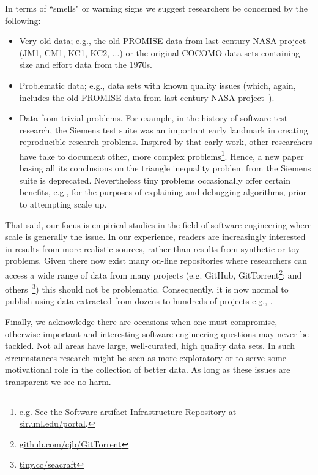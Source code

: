 \documentclass[10pt]{elsarticle}
\begin{document}
In terms of ``smells" or warning signs we suggest researchers be concerned by the following:
\begin{itemize}
\item Very old data; e.g., the old PROMISE data from last-century NASA project (JM1, CM1, KC1, KC2, ...) or the original COCOMO data sets containing size and effort data from the 1970s.
\item Problematic data; e.g., data sets with known quality issues (which, again, includes the old PROMISE data from last-century NASA project~\cite{shepperd13}).
\item Data from trivial problems.  For example, in the history of software test research, the Siemens test suite
was an important early landmark in creating reproducible research problems. Inspired by that early work, other researchers have take to document other, more complex problems\footnote{e.g. See the Software-artifact Infrastructure Repository at
\href{http://sir.unl.edu/portal}{sir.unl.edu/portal}.}. Hence, a new paper basing all its conclusions on the triangle inequality problem from the Siemens suite is deprecated.   Nevertheless tiny problems occasionally offer certain benefits, e.g., for the purposes of explaining and debugging algorithms, prior to attempting scale up. 
\end{itemize}

That said, our focus is empirical studies in the field of software engineering where scale is generally the issue. In our experience, readers are increasingly interested in results from more realistic sources, rather than results from synthetic or toy problems. Given there now exist many on-line repositories where researchers can access a wide range of data from many projects (e.g. GitHub, GitTorrent\footnote{\href{https://github.com/cjb/GitTorrent}{github.com/cjb/GitTorrent}}; and others~\footnote{\href{http://tiny.cc/seacraft}{tiny.cc/seacraft}}) this should not be problematic. Consequently, it is now normal to publish using data extracted from dozens to hundreds of projects e.g., \cite{rahulSEIP, amritSeip18b}.

Finally, we acknowledge there are occasions when one must compromise, otherwise important and interesting software engineering questions may never be tackled.  Not all areas have large, well-curated, high quality data sets.  In such circumstances research might be seen as more exploratory or to serve some motivational role in the collection of better data.  As long as these issues are transparent we see no harm.
\end{document}
